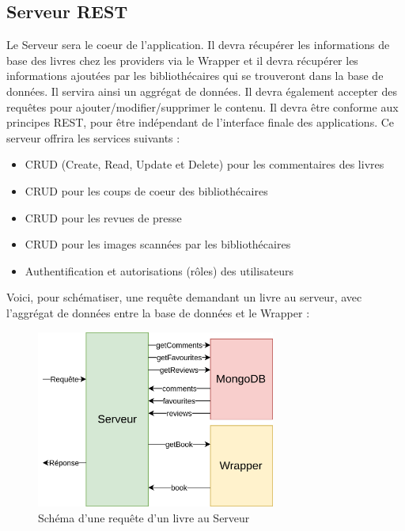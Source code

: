 \documentclass[a4paper, 12pt]{article}
\begin{document}
\subsection{Serveur REST}
Le Serveur sera le coeur de l'application. Il devra récupérer les informations de base des livres chez les providers
via le Wrapper et il devra récupérer les informations ajoutées par les bibliothécaires qui se trouveront dans la base
de données. Il servira ainsi un aggrégat de données. Il devra également accepter des requêtes pour
ajouter/modifier/supprimer le contenu. Il devra être conforme aux principes REST, pour être indépendant de l'interface
finale des applications. Ce serveur offrira les services suivants :
\begin{itemize}
    \item CRUD (Create, Read, Update et Delete) pour les commentaires des livres
    \item CRUD pour les coups de coeur des bibliothécaires
    \item CRUD pour les revues de presse
    \item CRUD pour les images scannées par les bibliothécaires
    \item Authentification et autorisations (rôles) des utilisateurs
\end{itemize}
Voici, pour schématiser, une requête demandant un livre au serveur, avec l'aggrégat de données entre la base de données
et le Wrapper :
\begin{figure}
    \begin{center}
        \includegraphics[width=0.7\textwidth]{images/architecture_server.png}
    \end{center}
    \caption{Schéma d'une requête d'un livre au Serveur}
\end{figure}
\end{document}
